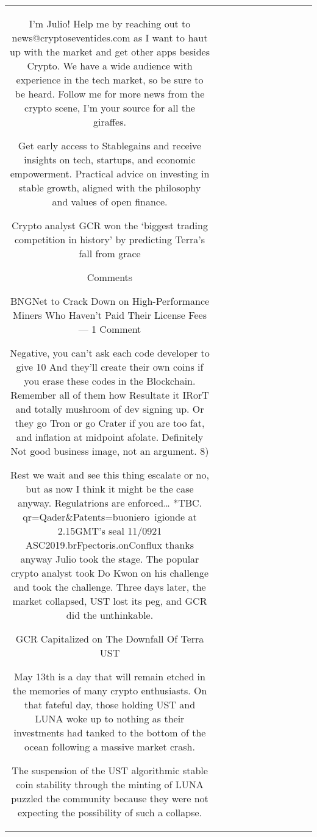 \begin{table}[h!]
\begin{tabular}{|c|c|c|c|c|c|c|c|c|c|c|}
I'm Julio! Help me by reaching out to news@cryptoseventides.com as I want to haut up with the market and get other apps besides Crypto. We have a wide audience with experience in the tech market, so be sure to be heard. Follow me for more news from the crypto scene, I'm your source for all the giraffes.

Get early access to Stablegains and receive insights on tech, startups, and economic empowerment. Practical advice on investing in stable growth, aligned with the philosophy and values of open finance.

Crypto analyst GCR won the ‘biggest trading competition in history’ by predicting Terra’s fall from grace

Comments

BNGNet to Crack Down on High-Performance Miners Who Haven’t Paid Their License Fees — 1 Comment

Negative, you can’t ask each code developer to give 10%
And they’ll create their own coins if you erase these codes in the Blockchain. Remember all of them how Resultate it IRorT and totally mushroom of dev signing up. Or they go Tron or go Crater if you are too fat, and inflation at midpoint afolate. Definitely Not good business image, not an argument. 8)

Rest we wait and see this thing escalate or no, but as now I think it might be the case anyway. Regulatrions are enforced… *TBC. qr=Qader\&Patents=buoniero~igionde at 2.15GMT’s seal 11/0921 ASC2019.brFpectoris.onConflux thanks anyway Julio took the stage. The popular crypto analyst took Do Kwon on his challenge and took the challenge. Three days later, the market collapsed, UST lost its peg, and GCR did the unthinkable.

GCR Capitalized on The Downfall Of Terra UST

May 13th is a day that will remain etched in the memories of many crypto enthusiasts. On that fateful day, those holding UST and LUNA woke up to nothing as their investments had tanked to the bottom of the ocean following a massive market crash.

The suspension of the UST algorithmic stable coin stability through the minting of LUNA puzzled the community because they were not expecting the possibility of such a collapse.


\end{tabular}
\end{table}
